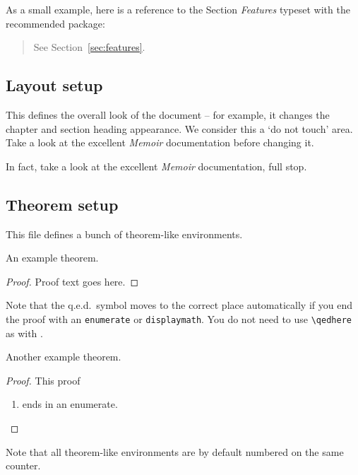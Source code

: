As a small example, here is a reference to the Section \emph{Features}
typeset with the recommended  package:
\begin{quote}
	See Section~\vref{sec:features}.
\end{quote}


\subsection{Layout setup}

This defines the overall look of the document -- for example, it
changes the chapter and section heading appearance.  We consider this
a `do not touch' area.  Take a look at the excellent \emph{Memoir}
documentation before changing it.

In fact, take a look at the excellent \emph{Memoir} documentation,
full stop.


\subsection{Theorem setup}

This file defines a bunch of theorem-like environments.

\begin{theorem}
	An example theorem.
\end{theorem}

\begin{proof}
	Proof text goes here.
\end{proof}

Note that the q.e.d.\ symbol moves to the correct place automatically
if you end the proof with an \texttt{enumerate} or
\texttt{displaymath}.  You do not need to use \verb-\qedhere- as with
.

\begin{theorem}
	Another example theorem.
\end{theorem}

\begin{proof}
	This proof
	\begin{enumerate}
		\item ends in an enumerate.
	\end{enumerate}
\end{proof}

\begin{proposition}
	Note that all theorem-like environments are by default numbered on
	the same counter.
\end{proposition}

